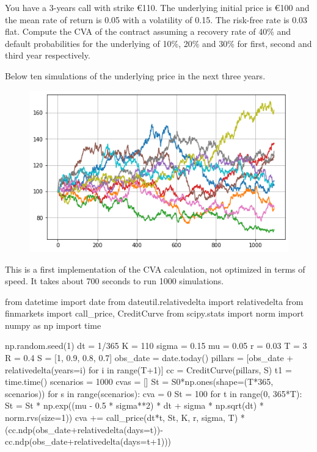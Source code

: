 \begin{question}
You have a 3-years call with strike \euro{110}. The underlying initial price is \euro{100} and the mean rate of return is 0.05 with a volatility of 0.15. The risk-free rate is 0.03 flat.
Compute the CVA of the contract assuming a recovery rate of 40\% and default probabilities for the underlying of 10\%, 20\% and 30\% for first, second and third year respectively.
\end{question}

\cprotEnv\begin{solution}
Below ten simulations of the underlying price in the next three years.

\begin{figure}[htbp]
	\centering
\includegraphics[width=0.7\linewidth]{figures/underlying_simulation}
\end{figure}
This is a first implementation of the CVA calculation, not optimized in terms of speed. It takes about 700 seconds to run 1000 simulations.

\begin{ipython}
from datetime import date
from dateutil.relativedelta import relativedelta
from finmarkets import call_price, CreditCurve
from scipy.stats import norm
import numpy as np
import time

np.random.seed(1)
dt = 1/365
K = 110
sigma = 0.15
mu = 0.05
r = 0.03
T = 3
R = 0.4
S = [1, 0.9, 0.8, 0.7]
obs_date = date.today()
pillars = [obs_date + relativedelta(years=i) for i in range(T+1)]
cc = CreditCurve(pillars, S)
t1 = time.time()
scenarios = 1000
cvas = []
St = S0*np.ones(shape=(T*365, scenarios))
for s in range(scenarios):
    cva = 0
    St = 100
    for t in range(0, 365*T):
        St = St * np.exp((mu - 0.5 * sigma**2) * dt + sigma
            * np.sqrt(dt) * norm.rvs(size=1))
        cva += call_price(dt*t, St, K, r, sigma, T)
            *(cc.ndp(obs_date+relativedelta(days=t))-
            cc.ndp(obs_date+relativedelta(days=t+1)))


\end{ipython}
\end{solution}

